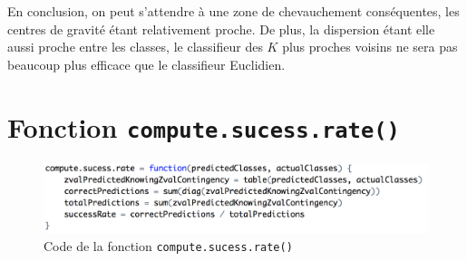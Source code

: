 \documentclass[a4paper,10pt]{report}
\begin{document}
En conclusion, on peut s'attendre à une zone de chevauchement conséquentes, les centres de gravité étant relativement proche. De plus, la dispersion étant elle aussi proche entre les classes, le classifieur des $K$ plus proches voisins ne sera pas beaucoup plus efficace que le classifieur Euclidien.

\appendix

\chapter{Fonction \texttt{compute.sucess.rate()}}
\begin{figure}[H]
	\centering
	\captionsetup{justification=centering, margin=4cm}
	\includegraphics[width=.9\linewidth]{img/annexe-1-compute-sucess-rate}
	\caption{\small Code de la fonction \texttt{compute.sucess.rate()}}	
	\label{fig:annexe-1-compute-sucess-rate}%
\end{figure}
\end{document}
